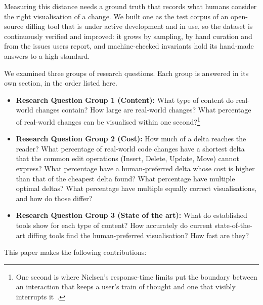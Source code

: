 \documentclass[sigconf,review]{acmart}
\begin{document}
Measuring this distance needs a ground truth that records what humans consider the right
visualisation of a change. We built one as the test corpus of an open-source diffing tool that is
under active development and in use, so the dataset is continuously verified and improved: it
grows by sampling, by hand curation and from the issues users report, and \InvariantCount{}
machine-checked invariants hold its hand-made answers to a high standard.

We examined three groups of research questions. Each group is answered in its own section, in the
order listed here.

\begin{itemize}
  \item \textbf{Research Question Group 1 (Content):} What type of content do real-world changes
    contain? How large are real-world changes? What percentage of real-world changes can be
    visualised within one second?\footnote{One second is where Nielsen's response-time limits put
    the boundary between an interaction that keeps a user's train of thought and one that visibly
    interrupts it~\cite{nielsen-usability}.}
  \item \textbf{Research Question Group 2 (Cost):} How much of a delta reaches the reader? What
    percentage of real-world code changes have a shortest delta that the common edit operations
    (Insert, Delete, Update, Move) cannot express? What percentage have a human-preferred delta
    whose cost is higher than that of the cheapest delta found? What percentage have multiple
    optimal deltas? What percentage have multiple equally correct visualisations, and how do those
    differ?
  \item \textbf{Research Question Group 3 (State of the art):} What do established tools show
    for each type of content? How accurately do current state-of-the-art diffing tools find
    the human-preferred visualisation? How fast are they?
\end{itemize}

This paper makes the following contributions:
\end{document}
